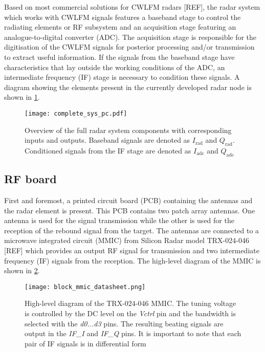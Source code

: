 Based on most commercial solutions for CWLFM radars [REF], the radar system which works with CWLFM signals features a baseband stage to control the radiating elements or RF subsystem and an acquisition stage featuring an analogue-to-digital converter (ADC). The acquisition stage is responsible for the digitisation of the CWLFM signals for posterior processing and/or transmission to extract useful information. If the signals from the baseband stage have characteristics that lay outside the working conditions of the ADC, an intermediate frequency (IF) stage is necessary to condition these signals. A diagram showing the elements present in the currently developed radar node is shown in \cref{fig:system}.

\begin{figure}[ht]
	\centering
	\texttt{[image: complete\_sys\_pc.pdf]}
	\caption{Overview of the full radar system components with corresponding inputs and outputs. Baseband signals are denoted as $I_{\mathrm{rad}}$ and $Q_{\mathrm{rad}}$. Conditioned signals from the IF stage are denoted as $I_{\mathrm{adc}}$ and $Q_{\mathrm{adc}}$ \label{fig:system}}
\end{figure}

\subsection{RF board} \label{sec:rf_board_general}

First and foremost, a printed circuit board (PCB) containing the antennas and the radar element is present. This PCB contains two patch array antennas. One antenna is used for the signal transmission while the other is used for the reception of the rebound signal from the target. The antennas are connected to a microwave integrated circuit (MMIC) from Silicon Radar model TRX-024-046 [REF] which provides an output RF signal for transmission and two intermediate frequency (IF) signals from the reception. The high-level diagram of the MMIC is shown in \cref{fig:block_mmic_general}.

\begin{figure}[ht]
	\centering
	\texttt{[image: block\_mmic\_datasheet.png]}
	\caption{High-level diagram of the TRX-024-046 MMIC. The tuning voltage is controlled by the DC level on the \textit{Vctrl} pin and the bandwidth is selected with the \textit{d0...d3} pins. The resulting beating signals are output in the \textit{IF\_I} and \textit{IF\_Q} pins. It is important to note that each pair of IF signals is in differential form \label{fig:block_mmic_general}}
\end{figure}

